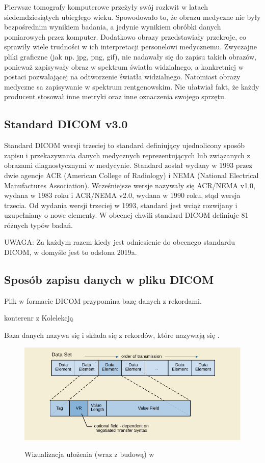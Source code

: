 

Pierwsze tomografy komputerowe przeżyły swój rozkwit w latach siedemdziesiątych ubiegłego wieku.
Spowodowało to, że obrazu medyczne nie były bezpośrednim wynikiem badania, a jedynie wynikiem obróbki danych pomiarowych przez komputer.
Dodatkowo obrazy przedstawiały przekroje, co sprawiły wiele trudności w ich interpretacji personelowi medycznemu.
Zwyczajne pliki graficzne (jak np. jpg, png, gif), nie nadawały się do zapisu takich obrazów, ponieważ zapisywały obraz w spektrum światła widzialnego, a konkretniej w postaci pozwalającej na odtworzenie światła widzialnego.
Natomiast obrazy medyczne sa zapisywanie w spektrum rentgenowskim.
Nie ułatwiał fakt, że każdy producent stosował inne metryki oraz inne oznaczenia swojego sprzętu.

\subsection{Standard DICOM v3.0}

Standard DICOM wersji trzeciej to standard definiujący ujednolicony sposób zapisu i przekazywania danych medycznych reprezentujących lub związanych z obrazami diagnostycznymi w medycynie.
Standard został wydany w 1993 przez dwie agencje ACR (American College of Radiology) i NEMA (National Electrical Manufactures Association).
Wcześniejsze wersje nazywały się ACR/NEMA v1.0, wydana w 1983 roku i ACR/NEMA v2.0, wydana w 1990 roku, stąd wersja trzecia.
Od wydania wersji trzeciej w 1993, standard jest wciąż rozwijany i uzupełniany o nowe elementy.
W obecnej chwili standard DICOM definiuje 81 różnych typów badań.

UWAGA: Za każdym razem kiedy jest odniesienie do obecnego standardu DICOM, w domyśle jest to odsłona 2019a.

\subsection{Sposób zapisu danych w pliku DICOM}

Plik w formacie DICOM przypomina bazę danych z rekordami.

konterenr z Kolelekcją

Baza danych nazywa się  i składa się z rekordów, które nazywają się .

\begin{figure}[!htbp]
    \caption{Wizualizacja ułożenia (wraz z budową) w }
    \includegraphics[]{img/dicom-dataelement001.pdf}
    \centering
    \label{fig:dicom-dataelement}
\end{figure}

